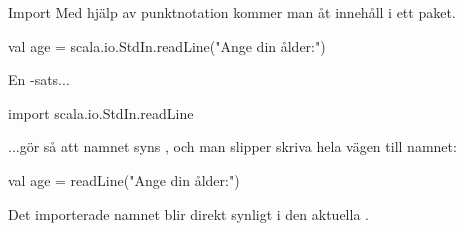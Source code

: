 \begin{Slide}{Import}
Med hjälp av punktnotation kommer man åt innehåll i ett paket.\\
\begin{Code}
val age = scala.io.StdIn.readLine("Ange din ålder:")
\end{Code}

En -sats...

\begin{Code}
import scala.io.StdIn.readLine
\end{Code}

...gör så att namnet syns , och man slipper skriva hela vägen till namnet:
\begin{Code}
val age = readLine("Ange din ålder:")
\end{Code}

Det importerade namnet blir direkt synligt i den aktuella  .
\end{Slide}


